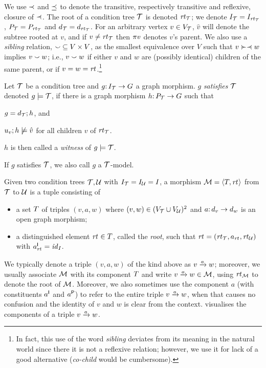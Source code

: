 We use $\ancestof$ and $\ancesteq$ to denote the transitive, respectively transitive and reflexive, closure of $\parentof$. The root of a condition tree $\cT$ is denoted $\rt\cT$; we denote $I_\cT=I_{\rt\cT}$, $P_\cT=P_{\rt\cT}$ and $d_\cT=d_{\rt\cT}$. For an arbitrary vertex $v\in V_\cT$, $\hat v$ will denote the subtree rooted at $v$, and if $v\neq\rt\cT$ then $\parent v$ denotes $v$'s parent. We also use a \emph{sibling} relation, ${\sibling}\subseteq V\times V$, as the smallest equivalence over $V$ such that $v\childof\parentof w$ implies $v\sibling w$; i.e., $v\sibling w$ if either $v$ and $w$ are (possibly identical) children of the same parent, or if $v=w=\rt{}$.\footnote{In fact, this use of the word \emph{sibling} deviates from its meaning in the natural world since there it is not a reflexive relation; however, we use it for lack of a good alternative (\emph{co-child} would be cumbersome).}

\begin{definition}[satisfaction]\label{def:satisfaction}
Let $\cT$ be a condition tree and $g\of I_\cT\to G$ a graph morphism. $g$ \emph{satisfies $\cT$} denoted $g\sat \cT$, if there is a graph morphism $h\of P_\cT\to G$ such that
\begin{inumerate}
\item $g=d_\cT;h$, and 
\item $u_v;h\nsat \hat v$ for all children $v$ of $\rt\cT$.
\end{inumerate}
$h$ is then called a \emph{witness} of $g\sat \cT$.
\end{definition}
%
If $g$ satisfies $\cT$, we also call $g$ a $\cT$-model.


\begin{definition}[morphism]\label{def:morphism}
Given two condition trees $\cT,\cU$ with $I_\cT=I_\cU=I$, a morphism $\cM=\tupof{\tp,\rt{}}$ from $\cT$ to $\cU$ is a tuple consisting of
\begin{itemize}
\item a set $\tp$ of triples $(v,a,w)$ where $(v,w)\in (V_\cT\cup V_\cU)^2$ and $a\of d_v\to d_w$ is an open graph morphism;
\item a distinguished element $\rt{}\in\tp$, called the \emph{root}, such that $\rt{}=(\rt\cT,a_{\rt{}},\rt\cU)$ with $a_{\rt{}}\I=\id_I$.
\end{itemize}
\end{definition}
%
We typically denote a triple $(v,a,w)$ of the kind above as $\trip vaw$; moreover, we usually associate $\cM$ with its component $\tp$ and write $\trip vaw\in\cM$, using $\rt\cM$ to denote the root of $\cM$. Moreover, we also sometimes use the component $a$ (with constituents $a\I$ and $a\P$) to refer to the entire triple $\trip vaw$, when that causes no confusion and the identity of $v$ and $w$ is clear from the context.  visualises the components of a triple $\trip vaw$.

